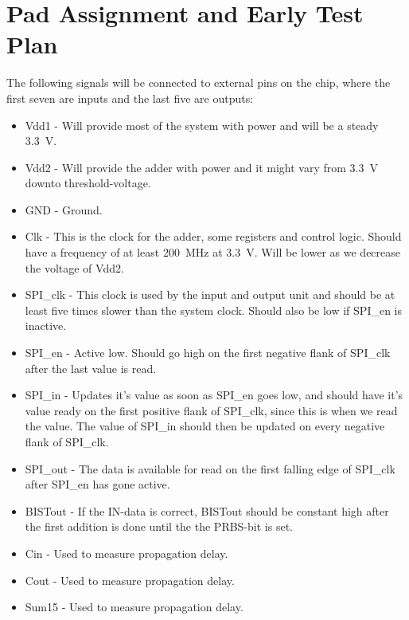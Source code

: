 \section{Pad Assignment and Early Test Plan}
The following signals will be connected to external pins on the chip, where the first seven are inputs and the last five are outputs:
\begin{itemize}
	\item Vdd1 - Will provide most of the system with power and will be a steady \SI{3.3}{\volt}.
	\item Vdd2 - Will provide the adder with power and it might vary from \SI{3.3}{\volt} downto threshold-voltage.
	\item GND - Ground.
	\item Clk - This is the clock for the adder, some registers and control logic. Should have a frequency of at least \SI{200}{\mega\hertz} at \SI{3.3}{\volt}. Will be lower as we decrease the voltage of Vdd2.
	\item SPI\_clk - This clock is used by the input and output unit and should be at least five times slower than the system clock. Should also be low if SPI\_en is inactive.
	\item SPI\_en - Active low. Should go high on the first negative flank of SPI\_clk after the last value is read.
	\item SPI\_in - Updates it's value as soon as SPI\_en goes low, and should have it's value ready on the first positive flank of SPI\_clk, since this is when we read the value. The value of SPI\_in should then be updated on every negative flank of SPI\_clk.
	\item SPI\_out - The data is available for read on the first falling edge of SPI\_clk after SPI\_en has gone active.
	\item BISTout - If the IN-data is correct, BISTout should be constant high after the first addition is done until the the PRBS-bit is set. 
	\item Cin - Used to measure propagation delay.
	\item Cout - Used to measure propagation delay.
	\item Sum15 - Used to measure propagation delay.
\end{itemize}
 
